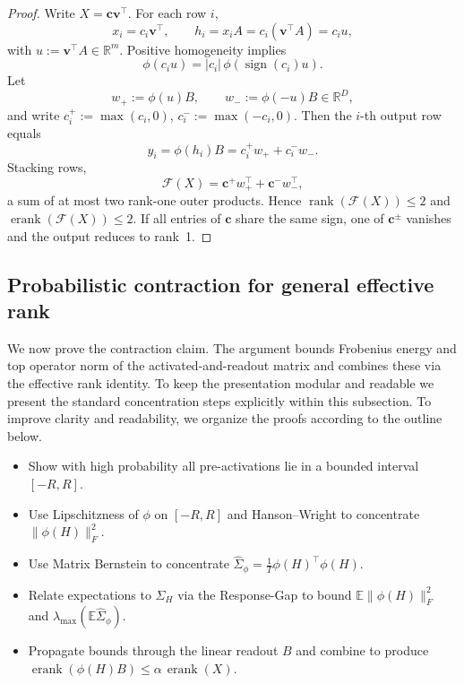 \documentclass[sigconf,screen]{acmart}
\begin{document}
\begin{proof}
Write \(X=\mathbf c\mathbf v^\top\). For each row \(i\),
\[
x_i = c_i \mathbf v^\top,\qquad
h_i = x_i A = c_i(\mathbf v^\top A) = c_i u,
\]
with \(u:=\mathbf v^\top A\in\mathbb R^m\). Positive homogeneity implies
\[
\phi(c_i u)=|c_i|\,\phi(\operatorname{sign}(c_i)u).
\]
Let
\[
w_+ := \phi(u)B,\qquad w_- := \phi(-u)B\in\mathbb R^D,
\]
and write \(c_i^+:=\max(c_i,0)\), \(c_i^-:=\max(-c_i,0)\). Then the \(i\)-th output row equals
\[
y_i = \phi(h_i)B = c_i^+ w_+ + c_i^- w_-.
\]
Stacking rows,
\[
\mathcal F(X)=\mathbf c^+ w_+^\top + \mathbf c^- w_-^\top,
\]
a sum of at most two rank-one outer products. Hence \(\operatorname{rank}(\mathcal F(X))\le 2\) and \(\operatorname{erank}(\mathcal F(X))\le 2\). If all entries of \(\mathbf c\) share the same sign, one of \(\mathbf c^\pm\) vanishes and the output reduces to rank~1.
\end{proof}

\subsection{Probabilistic contraction for general effective rank}
\label{app:prob_contraction_proof}

We now prove the contraction claim. The argument bounds Frobenius energy and top operator norm of the activated-and-readout matrix and combines these via the effective rank identity. To keep the presentation modular and readable we present the standard concentration steps explicitly within this subsection. To improve clarity and readability, we organize the proofs according to the outline below.

\begin{itemize}[leftmargin=15pt,parsep=2pt,itemsep=2pt,topsep=2pt]
  \item Show with high probability all pre-activations lie in a bounded interval \([-R,R]\).
  \item Use Lipschitzness of \(\phi\) on \([-R,R]\) and Hanson--Wright to concentrate \(\|\phi(H)\|_F^2\).
  \item Use Matrix Bernstein to concentrate \(\widehat\Sigma_\phi=\tfrac{1}{T}\phi(H)^\top\phi(H)\).
  \item Relate expectations to \(\Sigma_H\) via the Response-Gap to bound \(\mathbb E\|\phi(H)\|_F^2\) and \(\lambda_{\max}(\mathbb E\widehat\Sigma_\phi)\).
  \item Propagate bounds through the linear readout \(B\) and combine to produce \(\operatorname{erank}(\phi(H)B)\le\alpha\,\operatorname{erank}(X)\).
\end{itemize}
\end{document}
